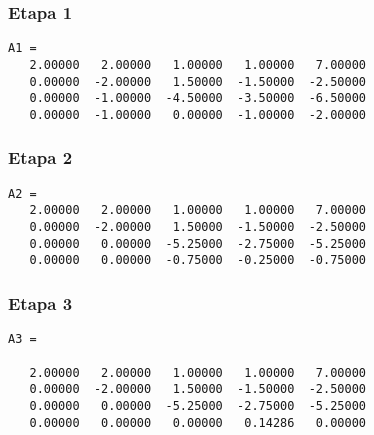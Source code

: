\documentclass[a4paper]{article}
\begin{document}
\subsubsection{Etapa 1}

\begin{verbatim}
A1 =
   2.00000   2.00000   1.00000   1.00000   7.00000
   0.00000  -2.00000   1.50000  -1.50000  -2.50000
   0.00000  -1.00000  -4.50000  -3.50000  -6.50000
   0.00000  -1.00000   0.00000  -1.00000  -2.00000
\end{verbatim}

\subsubsection{Etapa 2}

\begin{verbatim}
A2 =
   2.00000   2.00000   1.00000   1.00000   7.00000
   0.00000  -2.00000   1.50000  -1.50000  -2.50000
   0.00000   0.00000  -5.25000  -2.75000  -5.25000
   0.00000   0.00000  -0.75000  -0.25000  -0.75000
\end{verbatim}

\subsubsection{Etapa 3}

\begin{verbatim}
A3 =

   2.00000   2.00000   1.00000   1.00000   7.00000
   0.00000  -2.00000   1.50000  -1.50000  -2.50000
   0.00000   0.00000  -5.25000  -2.75000  -5.25000
   0.00000   0.00000   0.00000   0.14286   0.00000
\end{verbatim}
\end{document}
